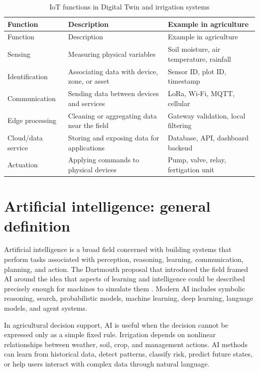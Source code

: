 \begin{footnotesize}
\setlength{\tabcolsep}{2pt}
\begin{longtable}{@{}>{\raggedright\arraybackslash}p{}>{\raggedright\arraybackslash}p{}>{\raggedright\arraybackslash}p{}@{}}
\caption{IoT functions in Digital Twin and irrigation systems}\\
\toprule
Function & Description & Example in agriculture \\
\midrule
\endfirsthead
\toprule
Function & Description & Example in agriculture \\
\midrule
\endhead
Sensing & Measuring physical variables & Soil moisture, air temperature, rainfall \\
Identification & Associating data with device, zone, or asset & Sensor ID, plot ID, timestamp \\
Communication & Sending data between devices and services & LoRa, Wi-Fi, MQTT, cellular \\
Edge processing & Cleaning or aggregating data near the field & Gateway validation, local filtering \\
Cloud/data service & Storing and exposing data for applications & Database, API, dashboard backend \\
Actuation & Applying commands to physical devices & Pump, valve, relay, fertigation unit \\
\bottomrule
\end{longtable}
\end{footnotesize}

\section{Artificial intelligence: general definition}

Artificial intelligence is a broad field concerned with building systems that perform tasks associated with perception, reasoning, learning, communication, planning, and action. The Dartmouth proposal that introduced the field framed AI around the idea that aspects of learning and intelligence could be described precisely enough for machines to simulate them \cite{mccarthy1955dartmouth}. Modern AI includes symbolic reasoning, search, probabilistic models, machine learning, deep learning, language models, and agent systems.

In agricultural decision support, AI is useful when the decision cannot be expressed only as a simple fixed rule. Irrigation depends on nonlinear relationships between weather, soil, crop, and management actions. AI methods can learn from historical data, detect patterns, classify risk, predict future states, or help users interact with complex data through natural language.

